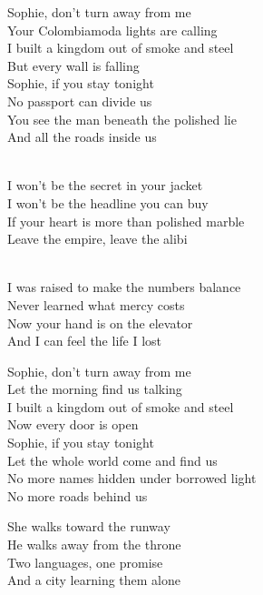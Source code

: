 \begin{lyrics}
Sophie, don't turn away from me\\
Your Colombiamoda lights are calling\\
I built a kingdom out of smoke and steel\\
But every wall is falling\\
Sophie, if you stay tonight\\
No passport can divide us\\
You see the man beneath the polished lie\\
And all the roads inside us

\\
I won't be the secret in your jacket\\
I won't be the headline you can buy\\
If your heart is more than polished marble\\
Leave the empire, leave the alibi

\\
I was raised to make the numbers balance\\
Never learned what mercy costs\\
Now your hand is on the elevator\\
And I can feel the life I lost


Sophie, don't turn away from me\\
Let the morning find us talking\\
I built a kingdom out of smoke and steel\\
Now every door is open\\
Sophie, if you stay tonight\\
Let the whole world come and find us\\
No more names hidden under borrowed light\\
No more roads behind us

She walks toward the runway\\
He walks away from the throne\\
Two languages, one promise\\
And a city learning them alone
\end{lyrics}

